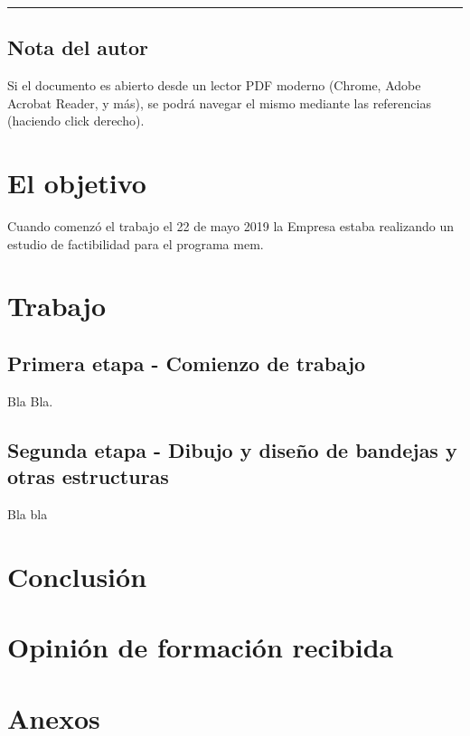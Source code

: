 \documentclass[titlepage,11pt]{article}
\begin{document}
    

\begin{abstract}

Un resumen debería no incluir referencias y no superar 250 palabras.
\end{abstract}

\newpage
\tableofcontents
\newpage
\printunsrtglossaries %

\vfill
\hrule
\vspace{-1cm}
\subsection*{Nota del autor}
Si el documento es abierto desde un lector PDF moderno (Chrome, Adobe Acrobat Reader, y más), se podrá navegar el mismo mediante las referencias (haciendo click derecho).
\newpage


\section{El objetivo}

Cuando comenzó el \gls{trabajo} el 22 de mayo 2019 la Empresa estaba realizando un estudio de factibilidad para el programa \gls{mem}.

\section{Trabajo}
 
\subsection[Primera etapa (Departamento investigación)]{Primera etapa - Comienzo de \gls{trabajo}} 
Bla Bla.

\subsection[Segunda etapa (Departamento ingeniería)]{Segunda etapa - Dibujo y diseño de bandejas y otras estructuras}

Bla bla



\section{Conclusión}




\section{Opinión de formación recibida}




\section{Anexos}

\listoffigures
{}

\end{document}
